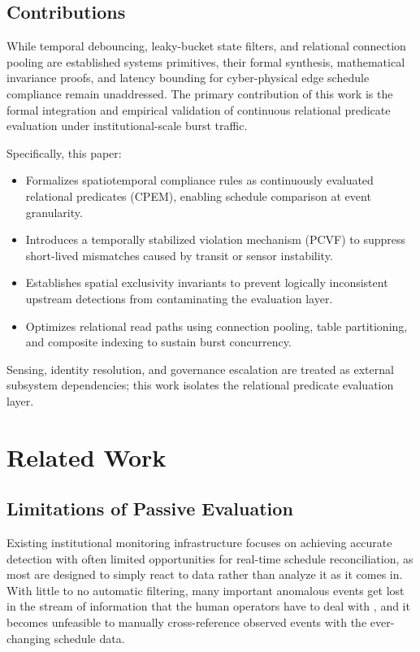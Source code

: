 \documentclass[conference]{IEEEtran}
\begin{document}
\subsection{Contributions}
While temporal debouncing, leaky-bucket state filters, and relational connection pooling are established systems primitives, their formal synthesis, mathematical invariance proofs, and latency bounding for cyber-physical edge schedule compliance remain unaddressed. The primary contribution of this work is the formal integration and empirical validation of continuous relational predicate evaluation under institutional-scale burst traffic.

Specifically, this paper:
\begin{itemize}
    \item Formalizes spatiotemporal compliance rules as continuously evaluated relational predicates (CPEM), enabling schedule comparison at event granularity.
    \item Introduces a temporally stabilized violation mechanism (PCVF) to suppress short-lived mismatches caused by transit or sensor instability.
    \item Establishes spatial exclusivity invariants to prevent logically inconsistent upstream detections from contaminating the evaluation layer.
    \item Optimizes relational read paths using connection pooling, table partitioning, and composite indexing to sustain burst concurrency.
\end{itemize}

Sensing, identity resolution, and governance escalation are treated as external subsystem dependencies; this work isolates the relational predicate evaluation layer.

\section{Related Work}

\subsection{Limitations of Passive Evaluation}
Existing institutional monitoring infrastructure focuses on achieving accurate detection with often limited opportunities for real-time schedule reconciliation, as most are designed to simply react to data rather than analyze it as it comes in. With little to no automatic filtering, many important anomalous events get lost in the stream of information that the human operators have to deal with \cite{b7}, and it becomes unfeasible to manually cross-reference observed events with the ever-changing schedule data.
\end{document}
